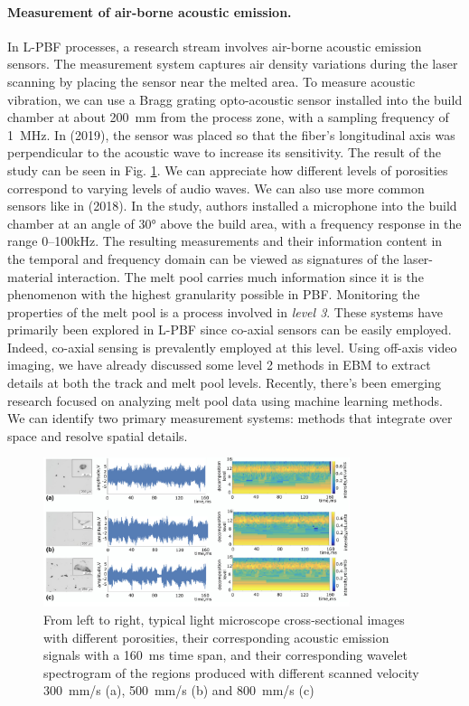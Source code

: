 \paragraph{Measurement of air-borne acoustic emission.} In L-PBF processes, a research stream involves air-borne acoustic emission sensors. The measurement system captures air density variations during the laser scanning by placing the sensor near the melted area. To measure acoustic vibration, we can use a Bragg grating opto-acoustic sensor installed into the build chamber at about \SI{200}{\milli\metre} from the process zone, with a sampling frequency of \SI{1}{\mega\hertz}. In \citeauthor{wasmer_situ_2019} (2019), the sensor was placed so that the fiber's longitudinal axis was perpendicular to the acoustic wave to increase its sensitivity. The result of the study can be seen in Fig. \ref{fig:acustic}. We can appreciate how different levels of porosities correspond to varying levels of audio waves. We can also use more common sensors like in \citeauthor{ye_defect_2018} (2018). In the study, authors installed a microphone into the build chamber at an angle of \ang{30} above the build area, with a frequency response in the range \numrange[range-phrase=--]{0}{100}\unit{\kilo\hertz}. The resulting measurements and their information content in the temporal and frequency domain can be viewed as signatures of the laser-material interaction.
The melt pool carries much information since it is the phenomenon with the highest granularity possible in PBF. Monitoring the properties of the melt pool is a process involved in \emph{level 3}. These systems have primarily been explored in L-PBF since co-axial sensors can be easily employed. Indeed, co-axial sensing is prevalently employed at this level. Using off-axis video imaging, we have already discussed some level 2 methods in EBM to extract details at both the track and melt pool levels. Recently, there's been emerging research focused on analyzing melt pool data using machine learning methods. We can identify two primary measurement systems: methods that integrate over space and resolve spatial details.
\begin{figure}
    \centering
    \includegraphics[width = 0.8\textwidth]{Images/acustic.png}
    \caption[Example of AE of different porosities specimens.] {From left to right, typical light microscope cross-sectional images with different porosities, their corresponding acoustic emission signals with a \SI{160}{\milli\second} time span, and their corresponding wavelet spectrogram of the regions produced with different scanned velocity \SI{300}{\milli\metre / \second} (a), \SI{500}{\milli\metre / \second} (b) and \SI{800}{\milli\metre /\second} (c) \cite{wasmer_situ_2019}}
    \label{fig:acustic}
\end{figure}
